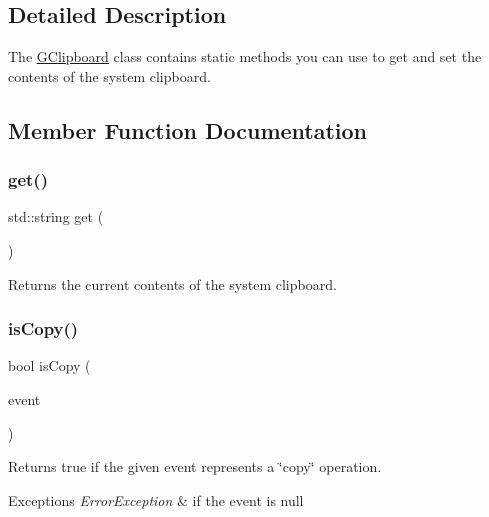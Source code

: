 \subsection{Detailed Description}
The \mbox{\hyperlink{classsgl_1_1GClipboard}{G\+Clipboard}} class contains static methods you can use to get and set the contents of the system clipboard. 

\subsection{Member Function Documentation}
\mbox{\label{classsgl_1_1GClipboard_a4879b26a87a0b49f7d535c7a669620f6}} 
\subsubsection{\texorpdfstring{get()}{get()}}
{\footnotesize\ttfamily std\+::string get (\begin{DoxyParamCaption}{ }\end{DoxyParamCaption})\hspace{0.3cm}{\ttfamily [static]}}



Returns the current contents of the system clipboard. 

\mbox{\label{classsgl_1_1GClipboard_a813cbc957e264a1846175ece316757d3}} 
\subsubsection{\texorpdfstring{is\+Copy()}{isCopy()}}
{\footnotesize\ttfamily bool is\+Copy (\begin{DoxyParamCaption}\item[{Q\+Key\+Event $\ast$}]{event }\end{DoxyParamCaption})\hspace{0.3cm}{\ttfamily [static]}}



Returns true if the given event represents a \char`\"{}copy\char`\"{} operation. 


\begin{DoxyExceptions}{Exceptions}
{\em Error\+Exception} & if the event is null \\
\hline
\end{DoxyExceptions}
\mbox{\label{classsgl_1_1GClipboard_a5ea46b856cb8eae1295b1e2b7db664aa}} 
